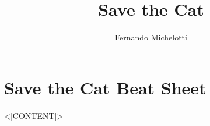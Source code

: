 \documentclass[12pt,a4paper,final,oneside]{book}
\author{Fernando Michelotti}
\title{Save the Cat}
\begin{document}

\section{Save the Cat Beat Sheet}

<[CONTENT]>
\end{document}
